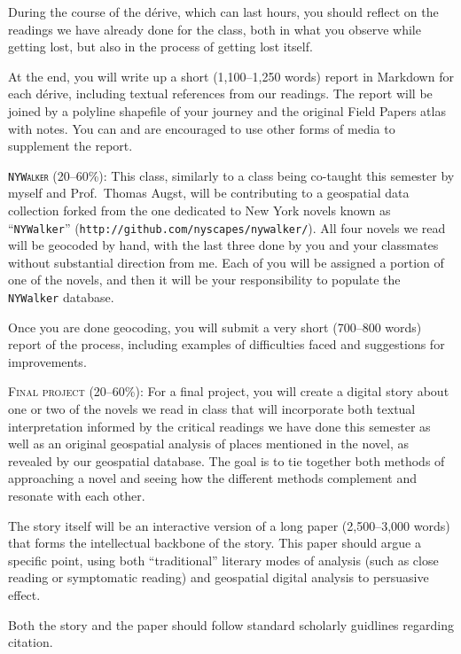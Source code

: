 \begin{description}
    During the course of the dérive, which can last hours, you should reflect
    on the readings we have already done for the class, both in what you
    observe while getting lost, but also in the process of getting lost itself.
    
    At the end, you will write up a short (1,100--1,250 words) report in
    Markdown for each dérive, including textual references from our readings.
    The report will be joined by a polyline shapefile of your journey and the
    original Field Papers atlas with notes. You can and are encouraged to use
    other forms of media to supplement the report.

  \item \textsc{\texttt{NYWalker} (20–60\%):} This class, similarly to a class
    being co-taught this semester by myself and Prof.\ Thomas Augst, will be
    contributing to a geospatial data collection forked from the one dedicated
    to New York novels known as “\texttt{NYWalker}”
    (\texttt{http://github.com/nyscapes/nywalker/}).  All four novels we read
    will be geocoded by hand, with the last three done by you and your
    classmates without substantial direction from me. Each of you will be
    assigned a portion of one of the novels, and then it will be your
    responsibility to populate the \texttt{NYWalker} database.

    Once you are done geocoding, you will submit a very short (700--800
    words) report of the process, including examples of difficulties faced and
    suggestions for improvements.

  \item \textsc{Final project (20–60\%):} For a final project, you will create a
    digital story about one or two of the novels we read in class that will
    incorporate both textual interpretation informed by the critical readings
    we have done this semester as well as an original geospatial analysis of
    places mentioned in the novel, as revealed by our geospatial database. The
    goal is to tie together both methods of approaching a novel and seeing how
    the different methods complement and resonate with each other.

    The story itself will be an interactive version of a long paper
    (2,500--3,000 words) that forms the intellectual backbone of the story.
    This paper should argue a specific point, using both “traditional” literary
    modes of analysis (such as close reading or symptomatic reading) and
    geospatial digital analysis to persuasive effect.

    Both the story and the paper should follow standard scholarly guidlines
    regarding citation.

\end{description}
